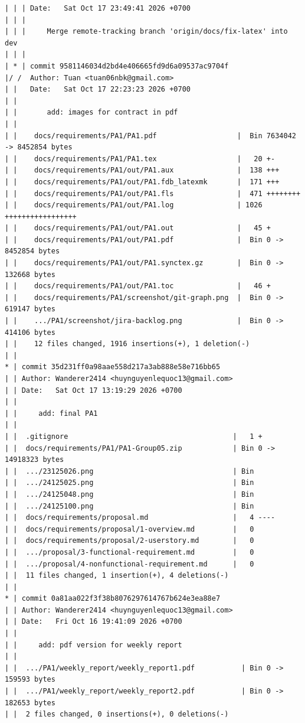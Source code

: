 \documentclass[12pt]{article}
\begin{document}
\begin{lstlisting}[numbers=none,breaklines=true]
| | | Date:   Sat Oct 17 23:49:41 2026 +0700
| | |
| | |     Merge remote-tracking branch 'origin/docs/fix-latex' into dev
| | |
| * | commit 9581146034d2bd4e406665fd9d6a09537ac9704f
|/ /  Author: Tuan <tuan06nbk@gmail.com>
| |   Date:   Sat Oct 17 22:23:23 2026 +0700
| |
| |       add: images for contract in pdf
| |
| |    docs/requirements/PA1/PA1.pdf                   |  Bin 7634042 -> 8452854 bytes
| |    docs/requirements/PA1/PA1.tex                   |   20 +-
| |    docs/requirements/PA1/out/PA1.aux               |  138 +++
| |    docs/requirements/PA1/out/PA1.fdb_latexmk       |  171 +++
| |    docs/requirements/PA1/out/PA1.fls               |  471 ++++++++
| |    docs/requirements/PA1/out/PA1.log               | 1026 +++++++++++++++++
| |    docs/requirements/PA1/out/PA1.out               |   45 +
| |    docs/requirements/PA1/out/PA1.pdf               |  Bin 0 -> 8452854 bytes
| |    docs/requirements/PA1/out/PA1.synctex.gz        |  Bin 0 -> 132668 bytes
| |    docs/requirements/PA1/out/PA1.toc               |   46 +
| |    docs/requirements/PA1/screenshot/git-graph.png  |  Bin 0 -> 619147 bytes
| |    .../PA1/screenshot/jira-backlog.png             |  Bin 0 -> 414106 bytes
| |    12 files changed, 1916 insertions(+), 1 deletion(-)
| |
* | commit 35d231ff0a98aae558d217a3ab888e58e716bb65
| | Author: Wanderer2414 <huynguyenlequoc13@gmail.com>
| | Date:   Sat Oct 17 13:19:29 2026 +0700
| |
| |     add: final PA1
| |
| |  .gitignore                                       |   1 +
| |  docs/requirements/PA1/PA1-Group05.zip            | Bin 0 -> 14918323 bytes
| |  .../23125026.png                                 | Bin
| |  .../24125025.png                                 | Bin
| |  .../24125048.png                                 | Bin
| |  .../24125100.png                                 | Bin
| |  docs/requirements/proposal.md                    |   4 ----
| |  docs/requirements/proposal/1-overview.md         |   0
| |  docs/requirements/proposal/2-userstory.md        |   0
| |  .../proposal/3-functional-requirement.md         |   0
| |  .../proposal/4-nonfunctional-requirement.md      |   0
| |  11 files changed, 1 insertion(+), 4 deletions(-)
| |
* | commit 0a81aa022f3f38b8076297614767b624e3ea88e7
| | Author: Wanderer2414 <huynguyenlequoc13@gmail.com>
| | Date:   Fri Oct 16 19:41:09 2026 +0700
| |
| |     add: pdf version for weekly report
| |
| |  .../PA1/weekly_report/weekly_report1.pdf           | Bin 0 -> 159593 bytes
| |  .../PA1/weekly_report/weekly_report2.pdf           | Bin 0 -> 182653 bytes
| |  2 files changed, 0 insertions(+), 0 deletions(-)

\end{lstlisting}
\end{document}
